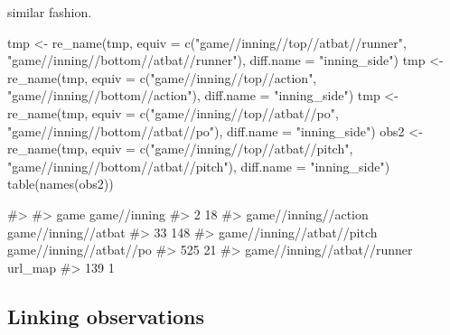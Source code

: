 \begin{article}
similar fashion.
%
\begin{Schunk}
\begin{Sinput}
tmp <- re_name(tmp, equiv = c("game//inning//top//atbat//runner",                             
  "game//inning//bottom//atbat//runner"), diff.name = "inning_side")
tmp <- re_name(tmp, equiv = c("game//inning//top//action",                             
  "game//inning//bottom//action"), diff.name = "inning_side")  
tmp <- re_name(tmp, equiv = c("game//inning//top//atbat//po",                            
  "game//inning//bottom//atbat//po"), diff.name = "inning_side")
obs2 <- re_name(tmp, equiv = c("game//inning//top//atbat//pitch",                             
  "game//inning//bottom//atbat//pitch"), diff.name = "inning_side") 
table(names(obs2))
\end{Sinput}
\begin{Soutput}
#> 
#>                        game                game//inning 
#>                           2                          18 
#>        game//inning//action         game//inning//atbat 
#>                          33                         148 
#>  game//inning//atbat//pitch     game//inning//atbat//po 
#>                         525                          21 
#> game//inning//atbat//runner                     url_map 
#>                         139                           1
\end{Soutput}
\end{Schunk}
%

\subsection{Linking observations}


\end{article}
